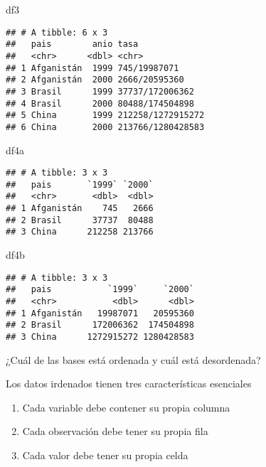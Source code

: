 \documentclass[
]{article}
\newenvironment{Shaded}{\begin{snugshade}}{\end{snugshade}}
\newcommand{\NormalTok}[1]{#1}
\begin{document}
\begin{Shaded}
\begin{Highlighting}[]
\NormalTok{df3}
\end{Highlighting}
\end{Shaded}

\begin{verbatim}
## # A tibble: 6 x 3
##   pais        anio tasa             
##   <chr>      <dbl> <chr>            
## 1 Afganistán  1999 745/19987071     
## 2 Afganistán  2000 2666/20595360    
## 3 Brasil      1999 37737/172006362  
## 4 Brasil      2000 80488/174504898  
## 5 China       1999 212258/1272915272
## 6 China       2000 213766/1280428583
\end{verbatim}

\begin{Shaded}
\begin{Highlighting}[]
\NormalTok{df4a}
\end{Highlighting}
\end{Shaded}

\begin{verbatim}
## # A tibble: 3 x 3
##   pais       `1999` `2000`
##   <chr>       <dbl>  <dbl>
## 1 Afganistán    745   2666
## 2 Brasil      37737  80488
## 3 China      212258 213766
\end{verbatim}

\begin{Shaded}
\begin{Highlighting}[]
\NormalTok{df4b}
\end{Highlighting}
\end{Shaded}

\begin{verbatim}
## # A tibble: 3 x 3
##   pais           `1999`     `2000`
##   <chr>           <dbl>      <dbl>
## 1 Afganistán   19987071   20595360
## 2 Brasil      172006362  174504898
## 3 China      1272915272 1280428583
\end{verbatim}

¿Cuál de las bases está ordenada y cuál está desordenada?

Los datos irdenados tienen tres características esenciales

\begin{enumerate}
\def\labelenumi{\arabic{enumi}.}
\item
  Cada variable debe contener su propia columna
\item
  Cada observación debe tener su propia fila
\item
  Cada valor debe tener su propia celda
\end{enumerate}
\end{document}
